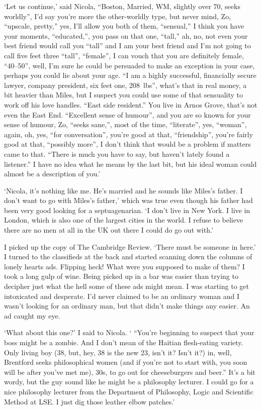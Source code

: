 `Let us continue,' said Nicola, ``Boston, Married, WM, slightly over 70, seeks worldly'', I'd say you're more the
{\twelveit other}-worldly type, but never mind, Zo, ``upscale,
pretty,'' yes, I'll allow you both of them, ``sensual,'' I think you
have your moments, ``educated,'', you pass on that {\twelveit one},
``tall,'' ah, no, not even your best friend would call you ``tall'' and I am your best friend and I'm not going to call five feet three
``tall'', ``female'', I can vouch that you are definitely female,
``40--50'', well, I'm sure he could be persuaded to make an
exception in your case, perhaps you could lie about your age. ``I am
a highly successful, financially secure lawyer, company president,
six feet one, 208~lbs'', what's that in real money, a bit heavier
than Miles, but I suspect you could use some of that sensuality to
work off his love handles. ``East side resident.'' You live in
Arnos Grove, that's not even the East End. ``Excellent sense of humour'', and you are so known for your
sense of humour, Zo, ``seeks sane,'', most of the time,
``literate'', yes, ``woman'', again, oh, yes, ``for conversation'',
you're good at that, ``friendship'', you're fairly good at that,
``possibly more'', I don't think that would be a problem if matters
came to that. ``There is much you have to say, but haven't lately
found a listener.'' I have no idea what he means by the last bit,
but his ideal woman could almost be a description of you.'

`Nicola, it's nothing like me. He's married and he sounds like
Miles's father. I don't want to go with Miles's father,' which was
true even though his father had been very good looking for a
septuagenarian. `I don't live in New York. I live in London, which is also one of the largest cities in the
world. I refuse to believe there are no men at all in the UK out
there I could do go out with.'

I picked up the copy of {\twelvesl The Cambridge Review}. `There
must be {\twelveit someone} in here.' I turned to the classifieds at
the back and started scanning down the columns of lonely hearts ads.
Flipping heck! What were you supposed to make of them? I took a long
gulp of wine. Being picked up in a bar was easier than trying to
decipher just what the hell some of these ads might mean. I was
starting to get intoxicated and desperate. I'd never claimed to be an
ordinary woman and I wasn't looking for an ordinary man, but that didn't make things any easier. An ad caught
my eye.

`What about this one?' I said to Nicola. ` ``You're beginning to
suspect that your boss might be a zombie. And I don't mean of the
Haitian flesh-eating variety. Only living boy (38, but, hey, 38 is
the new 23, isn't it? Isn't it?) in, well, Brentford seeks
philosophical women (and if you're not to start with, you soon will
be after you've met me), 30s, to go out for cheeseburgers and beer.'' It's a
bit wordy, but the guy sound like he might be a philosophy lecturer. I
could go for a nice philosophy lecturer from the Department of
Philosophy, Logic and Scientific Method at LSE. I just dig those
leather elbow patches.'

